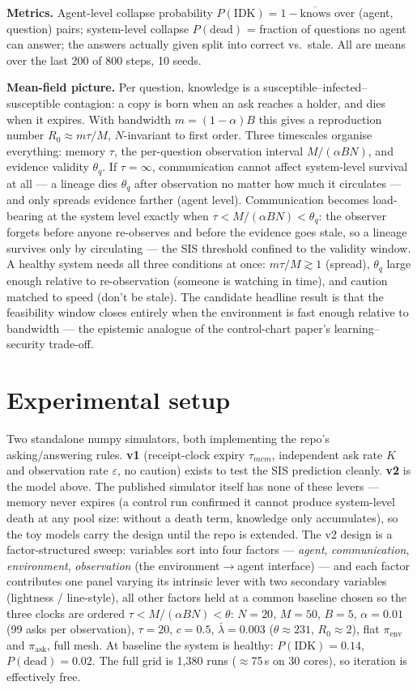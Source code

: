 \documentclass[10pt,twocolumn]{article}
\begin{document}
\textbf{Metrics.} Agent-level collapse probability
$P(\mathrm{IDK}) = 1 - \overline{\mathrm{knows}}$ over (agent, question)
pairs; system-level collapse $P(\mathrm{dead})$ = fraction of questions
no agent can answer; the answers actually given split into correct
vs.\ stale. All are means over the last 200 of 800 steps, 10 seeds.

\textbf{Mean-field picture.} Per question, knowledge is a
susceptible--infected--susceptible contagion: a copy is born when an ask
reaches a holder, and dies when it expires. With bandwidth
$m = (1-\alpha)B$ this gives a reproduction number
$R_0 \approx m\tau/M$, $N$-invariant to first order. Three timescales
organise everything: memory $\tau$, the per-question observation interval
$M/(\alpha B N)$, and evidence validity $\theta_q$. If $\tau = \infty$,
communication cannot affect system-level survival at all --- a lineage
dies $\theta_q$ after observation no matter how much it circulates ---
and only spreads evidence farther (agent level). Communication becomes
load-bearing at the system level exactly when
$\tau < M/(\alpha B N) < \theta_q$: the observer forgets before anyone
re-observes and before the evidence goes stale, so a lineage survives
only by circulating --- the SIS threshold confined to the validity
window. A healthy system needs all three conditions at once:
$m\tau/M \gtrsim 1$ (spread), $\theta_q$ large enough relative to
re-observation (someone is watching in time), and caution matched to
speed (don't be stale). The candidate headline result is that the
feasibility window closes entirely when the environment is fast enough
relative to bandwidth --- the epistemic analogue of the control-chart
paper's learning--security trade-off.

\section*{Experimental setup}
Two standalone numpy simulators, both implementing the repo's
asking/answering rules. \textbf{v1} (receipt-clock expiry $\tau_{mem}$,
independent ask rate $K$ and observation rate $\varepsilon$, no caution)
exists to test the SIS prediction cleanly. \textbf{v2} is the model
above. The published simulator itself has none of these levers ---
memory never expires (a control run confirmed it cannot produce
system-level death at any pool size: without a death term, knowledge
only accumulates), so the toy models carry the design until the repo is
extended. The v2 design is a factor-structured sweep: variables sort
into four factors --- \emph{agent}, \emph{communication},
\emph{environment}, \emph{observation} (the environment$\to$agent
interface) --- and each factor contributes one panel varying its
intrinsic lever with two secondary variables (lightness / line-style),
all other factors held at a common baseline chosen so the three clocks
are ordered $\tau < M/(\alpha BN) < \theta$: $N{=}20$, $M{=}50$,
$B{=}5$, $\alpha{=}0.01$ (99 asks per observation), $\tau{=}20$,
$c{=}0.5$, $\bar\lambda{=}0.003$ ($\theta\approx231$, $R_0\approx2$),
flat $\pi_{\mathrm{env}}$ and $\pi_{\mathrm{ask}}$, full mesh. At
baseline the system is healthy: $P(\mathrm{IDK})=0.14$,
$P(\mathrm{dead})=0.02$. The full grid is 1{,}380 runs
($\approx$75\,s on 30 cores), so iteration is effectively free.
\end{document}
